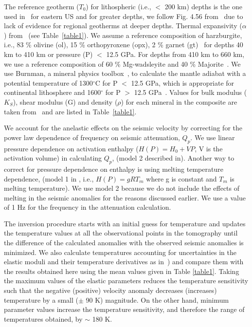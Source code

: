 \documentclass[draft,linenumbers]{agujournal2018}
\begin{document}
The reference geotherm ($T_0$) for lithospheric (i.e., $<$ 200 km) depths is the one used in~\citep{Goes_2002} for eastern US and for greater depths, we follow Fig. 4.56 from~\citet{turcotte2014geodynamics} due to lack of evidence for regional geotherms at deeper depths. Thermal expansivity ($\alpha$) from~\citet{saxena_data} (see Table~\ref{table1}). We assume a reference composition of harzburgite, i.e., 83 \% olivine (ol), 15 \% orthopyroxene (opx), 2 \% garnet (gt)~\citep{mcdonough1998mineralogy} for depths 40 km to 410 km or pressure (P) $<$ 12.5 GPa. For depths from 410 km to 660 km, we use a reference composition of 60 \% Mg-wadsleyite and 40 \% Majorite~\citep{haggerty1995upper}. We use Burnman, a mineral physics toolbox~\citep{cottaar2014burnman}, to calculate the mantle adiabat with a potential temperature of 1300$^{\circ}$C for P $<$ 12.5 GPa, which is appropriate for continental lithosphere \citep{rudnick1998thermal} and 1600$^{\circ}$ for P $>$ 12.5 GPa~\citep{katsura2010adiabatic}. Values for bulk modulus ($K_S$), shear modulus (G) and density ($\rho$) for each mineral in the composite are taken from~\citet{Cammarano2003} and are listed in Table~\ref{table1}.

We account for the anelastic effects on the seismic velocity by correcting for the power law dependence of frequency on seismic attenuation, $Q_p$. We use linear pressure dependence on activation enthalpy ($H(P)= H_0 + VP$, V is the activation volume) in calculating $Q_p$, (model 2 described in\citet{sobolev1996upper}). Another way to correct for pressure dependence on enthalpy is using melting temperature dependence, (model 1 in \citet{sobolev1996upper}, i.e., $H(P)= gRT_m$ where g is constant and $T_m$ is melting temperature). We use model 2 because we do not include the effects of melting in the seismic anomalies for the reasons discussed earlier. We use a value of 1 Hz for the frequency in the attenuation calculation.

The inversion procedure starts with an initial guess for temperature and updates the temperature values at all the observational points in the tomography until the difference of the calculated anomalies with the observed seismic anomalies is minimized. We also calculate temperatures accounting for uncertainties in the elastic moduli and their temperature derivatives as in~\citep{Cammarano2003}) and compare them with the results obtained here using the mean values given in Table \ref{table1}. Taking the maximum values of the elastic parameters reduces the temperature sensitivity such that the negative (positive) velocity anomaly decreases (increases) temperature by a small ($\pm$ 90 K) magnitude. On the other hand, minimum parameter values increase the temperature sensitivity, and therefore the range of temperatures obtained, by $\sim$ 180 K.
\end{document}
